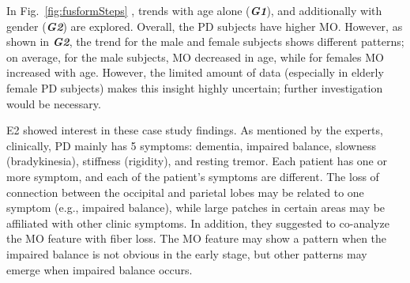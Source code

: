 In Fig.~\ref{fig:fusformSteps} , trends with age alone (\textbf{\textit{G1}}), and additionally with gender (\textbf{\textit{G2}}) are explored. Overall, the PD subjects have higher MO. However, as shown in \textbf{\textit{G2}}, the trend for the male and female subjects shows different patterns; on average, for the male subjects, MO decreased in age, while for females MO increased with age. However, the limited amount of data (especially in elderly female PD subjects) makes this insight highly uncertain; further investigation would be necessary. 

E2 showed interest in these case study findings. As mentioned by the experts, clinically, PD mainly has 5 symptoms: dementia, impaired balance, slowness (bradykinesia), stiffness (rigidity), and resting tremor. Each patient has one or more symptom, and each of the patient's symptoms are different. The loss of connection between the occipital and parietal lobes may be related to one symptom (e.g., impaired balance), while large patches in certain areas may be affiliated with other clinic symptoms. In addition, they suggested to co-analyze 
the MO feature with fiber loss. The MO feature may show a pattern when the impaired balance is not obvious in the early stage, but other patterns may emerge when impaired balance occurs.





